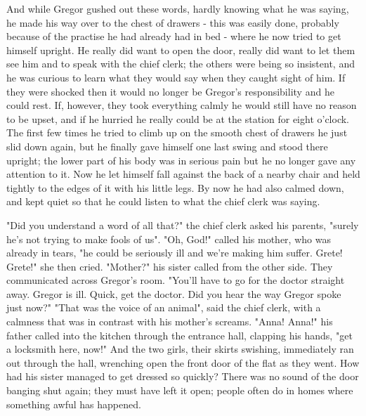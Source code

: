 And while Gregor gushed out these words, hardly knowing what he was saying, he made his way over to the chest of drawers - this was easily done, probably because of the practise he had already had in bed - where he now tried to get himself upright. He really did want to open the door, really did want to let them see him and to speak with the chief clerk; the others were being so insistent, and he was curious to learn what they would say when they caught sight of him. If they were shocked then it would no longer be Gregor's responsibility and he could rest. If, however, they took everything calmly he would still have no reason to be upset, and if he hurried he really could be at the station for eight o'clock. The first few times he tried to climb up on the smooth chest of drawers he just slid down again, but he finally gave himself one last swing and stood there upright; the lower part of his body was in serious pain but he no longer gave any attention to it. Now he let himself fall against the back of a nearby chair and held tightly to the edges of it with his little legs. By now he had also calmed down, and kept quiet so that he could listen to what the chief clerk was saying.

"Did you understand a word of all that?" the chief clerk asked his parents, "surely he's not trying to make fools of us". "Oh, God!" called his mother, who was already in tears, "he could be seriously ill and we're making him suffer. Grete! Grete!" she then cried. "Mother?" his sister called from the other side. They communicated across Gregor's room. "You'll have to go for the doctor straight away. Gregor is ill. Quick, get the doctor. Did you hear the way Gregor spoke just now?" "That was the voice of an animal", said the chief clerk, with a calmness that was in contrast with his mother's screams. "Anna! Anna!" his father called into the kitchen through the entrance hall, clapping his hands, "get a locksmith here, now!" And the two girls, their skirts swishing, immediately ran out through the hall, wrenching open the front door of the flat as they went. How had his sister managed to get dressed so quickly? There was no sound of the door banging shut again; they must have left it open; people often do in homes where something awful has happened.

